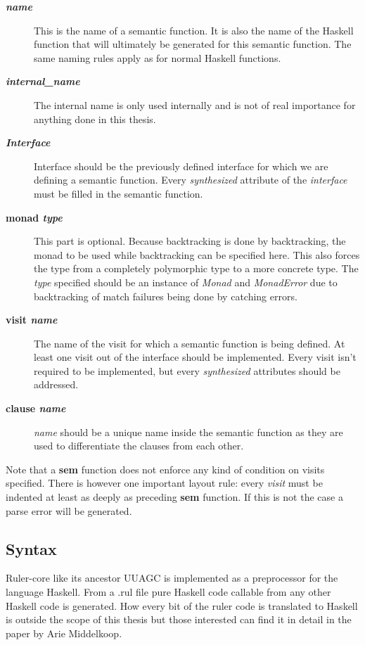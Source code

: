 \begin{description}
\item[\textbf{\textit{name}}] This is the name of a semantic function. It is also the name of the Haskell function that will ultimately be generated for this semantic function. The same naming rules apply as for normal Haskell functions.
\item[\textbf{\textit{internal\_name}}] The internal name is only used internally and is not of real importance for anything done in this thesis.
\item[\textbf{\textit{Interface}}] Interface should be the previously defined interface for which we are defining a semantic function. Every \emph{synthesized} attribute of the \emph{interface} must be filled in the semantic function.
\item[\textbf{monad \textit{type}}] { This part is optional. Because backtracking is done by backtracking, the monad to be used while backtracking can be specified here. This also forces the type from a completely polymorphic type to a more concrete type. The \textit{type} specified should be an instance of \emph{Monad} and \emph{MonadError} due to backtracking of match failures being done by catching errors.}
\item[\textbf{visit \textit{name}}] The name of the visit for which a semantic function is being defined. At least one visit out of the interface should be implemented. Every visit isn't required to be implemented, but every \emph{synthesized} attributes should be addressed.
\item[\textbf{clause \textit{name}}] \textit{name} should be a unique name inside the semantic function as they are used to differentiate the clauses from each other.
\end{description}

Note that a \textbf{sem} function does not enforce any kind of condition on visits specified. There is however one important layout rule: every \emph{visit} must be indented at least as deeply as preceding \textbf{sem} function. If this is not the case a parse error will be generated.

\subsection{Syntax}
Ruler-core like its ancestor UUAGC is implemented as a preprocessor for the language Haskell. From a .rul file pure Haskell code callable from any other Haskell code is generated. How every bit of the ruler code is translated to Haskell is outside the scope of this thesis but those interested can find it in detail in the paper by Arie Middelkoop\cite{visitag}.

